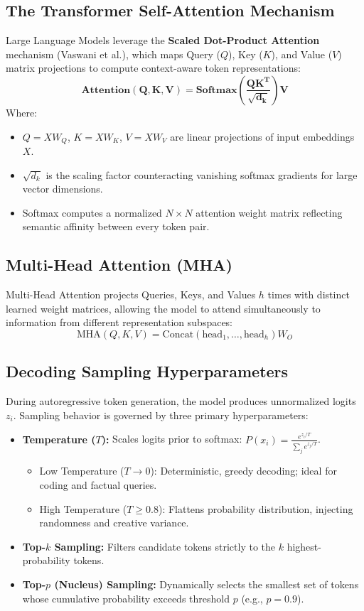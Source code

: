 \subsection{The Transformer Self-Attention Mechanism}
Large Language Models leverage the \textbf{Scaled Dot-Product Attention} mechanism (Vaswani et al.), which maps Query ($Q$), Key ($K$), and Value ($V$) matrix projections to compute context-aware token representations:
\begin{equation}
\label{eq:scaled_dot_product_attention}
\mathbf{\text{Attention}(Q, K, V) = \text{Softmax}\left( \frac{Q K^T}{\sqrt{d_k}} \right) V}
\end{equation}
Where:
\begin{itemize}
    \item $Q = X W_Q$, $K = X W_K$, $V = X W_V$ are linear projections of input embeddings $X$.
    \item $\sqrt{d_k}$ is the scaling factor counteracting vanishing softmax gradients for large vector dimensions.
    \item Softmax computes a normalized $N \times N$ attention weight matrix reflecting semantic affinity between every token pair.
\end{itemize}

\subsection{Multi-Head Attention (MHA)}
Multi-Head Attention projects Queries, Keys, and Values $h$ times with distinct learned weight matrices, allowing the model to attend simultaneously to information from different representation subspaces:
\begin{equation}
\text{MHA}(Q, K, V) = \text{Concat}(\text{head}_1, \dots, \text{head}_h) W_O
\end{equation}

\subsection{Decoding Sampling Hyperparameters}
During autoregressive token generation, the model produces unnormalized logits $z_i$. Sampling behavior is governed by three primary hyperparameters:
\begin{itemize}
    \item \textbf{Temperature ($T$):} Scales logits prior to softmax: $P(x_i) = \frac{e^{z_i / T}}{\sum_j e^{z_j / T}}$.
    \begin{itemize}
        \item Low Temperature ($T \to 0$): Deterministic, greedy decoding; ideal for coding and factual queries.
        \item High Temperature ($T \ge 0.8$): Flattens probability distribution, injecting randomness and creative variance.
    \end{itemize}
    \item \textbf{Top-$k$ Sampling:} Filters candidate tokens strictly to the $k$ highest-probability tokens.
    \item \textbf{Top-$p$ (Nucleus) Sampling:} Dynamically selects the smallest set of tokens whose cumulative probability exceeds threshold $p$ (e.g., $p = 0.9$).
\end{itemize}



